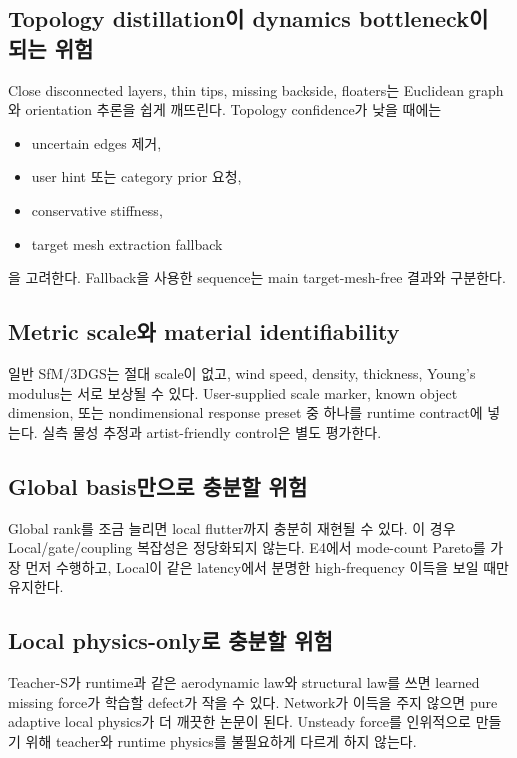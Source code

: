 \documentclass[11pt,a4paper]{article}
\begin{document}
\subsection{Topology distillation이 dynamics bottleneck이 되는 위험}

Close disconnected layers, thin tips, missing backside, floaters는
Euclidean graph와 orientation 추론을 쉽게 깨뜨린다.
Topology confidence가 낮을 때에는

\begin{itemize}[leftmargin=1.5em]
  \item uncertain edges 제거,
  \item user hint 또는 category prior 요청,
  \item conservative stiffness,
  \item target mesh extraction fallback
\end{itemize}

을 고려한다.
Fallback을 사용한 sequence는 main target-mesh-free 결과와 구분한다.

\subsection{Metric scale와 material identifiability}

일반 SfM/3DGS는 절대 scale이 없고,
wind speed, density, thickness, Young's modulus는 서로 보상될 수 있다.
User-supplied scale marker, known object dimension,
또는 nondimensional response preset 중 하나를 runtime contract에 넣는다.
실측 물성 추정과 artist-friendly control은 별도 평가한다.

\subsection{Global basis만으로 충분할 위험}

Global rank를 조금 늘리면 local flutter까지 충분히 재현될 수 있다.
이 경우 Local/gate/coupling 복잡성은 정당화되지 않는다.
E4에서 mode-count Pareto를 가장 먼저 수행하고,
Local이 같은 latency에서 분명한 high-frequency 이득을 보일 때만 유지한다.

\subsection{Local physics-only로 충분할 위험}

Teacher-S가 runtime과 같은 aerodynamic law와 structural law를 쓰면
learned missing force가 학습할 defect가 작을 수 있다.
Network가 이득을 주지 않으면 pure adaptive local physics가 더 깨끗한 논문이 된다.
Unsteady force를 인위적으로 만들기 위해 teacher와 runtime physics를 불필요하게 다르게 하지 않는다.
\end{document}
